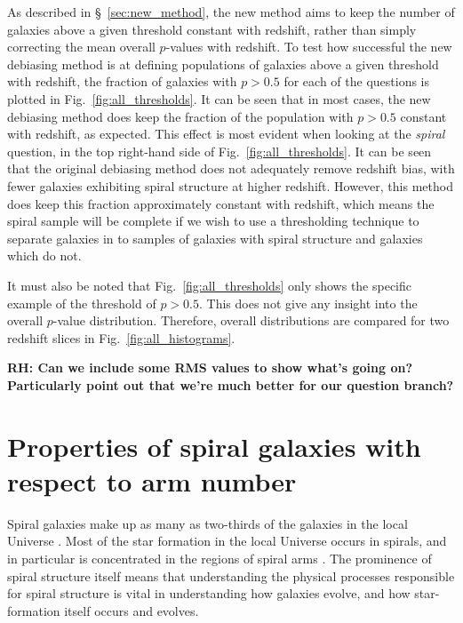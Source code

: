 \documentclass[useAMS,usenatbib]{mn2e}
\newcommand{\rh}[1]{{\bf \textcolor{RoyalPurple}{RH: #1}}}
\begin{document}
As described in \S~\ref{sec:new_method}, the new method aims to keep the number of galaxies above a given threshold constant with redshift, rather than simply correcting the mean overall $p$-values with redshift. To test how successful the new debiasing method is at defining populations of galaxies above a given threshold with redshift, the fraction of galaxies with $p>0.5$ for each of the questions is plotted in Fig.~\ref{fig:all_thresholds}. It can be seen that in most cases, the new debiasing method does keep the fraction of the population with $p>0.5$ constant with redshift, as expected. This effect is most evident when looking at the \textit{spiral} question, in the top right-hand side of Fig.~\ref{fig:all_thresholds}. It can be seen that the original debiasing method does not adequately remove redshift bias, with fewer galaxies exhibiting spiral structure at higher redshift. However, this method does keep this fraction approximately constant with redshift, which means the spiral sample will be complete if we wish to use a thresholding technique to separate galaxies in to samples of galaxies with spiral structure and galaxies which do not. 

It must also be noted that Fig.~\ref{fig:all_thresholds} only shows the specific example of the threshold of $p>0.5$. This does not give any insight into the overall $p$-value distribution. Therefore, overall distributions are compared for two redshift slices in Fig.~\ref{fig:all_histograms}. 

\rh{Can we include some RMS values to show what's going on? Particularly point out that we're much better for our question branch?}


\section{Properties of spiral galaxies with respect to arm number}
\label{sec:results}

Spiral galaxies make up as many as two-thirds of the galaxies in the local Universe \citep{Lintott_11,Willett_13}. Most of the star formation in the local Universe occurs in spirals, and in particular is concentrated in the regions of spiral arms \citep{Dobbs_14}. The prominence of spiral structure itself means that understanding the physical processes responsible for spiral structure is vital in understanding how galaxies evolve, and how star-formation itself occurs and evolves.
\end{document}
